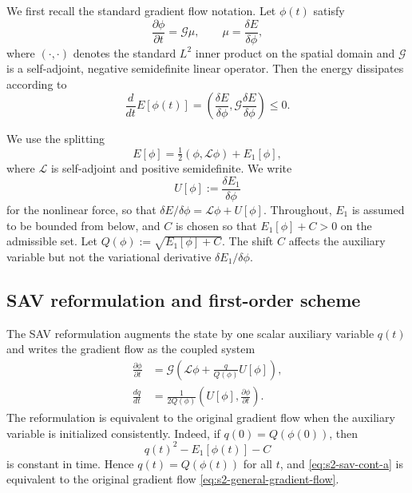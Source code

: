 \documentclass[10pt,onefignum,onetabnum,hidelinks]{siamart251216}
\begin{document}
We first recall the standard gradient flow notation. Let $\phi(t)$ satisfy
\begin{equation}
\frac{\partial \phi}{\partial t}
=
\mathcal G \mu,
\qquad
\mu=\frac{\delta E}{\delta\phi},
\label{eq:s2-general-gradient-flow}
\end{equation}
where $(\cdot,\cdot)$ denotes the standard $L^2$ inner product on the spatial domain and $\mathcal G$ is a self-adjoint, negative semidefinite linear operator. Then the energy dissipates according to
\begin{equation}
\frac{d}{dt}E[\phi(t)]
=
\left(
\frac{\delta E}{\delta\phi},
\mathcal G\frac{\delta E}{\delta\phi}
\right)
\le 0.
\label{eq:s2-continuous-energy-law}
\end{equation}

We use the splitting
\begin{equation}
E[\phi]=\tfrac12(\phi,\mathcal L\phi)+E_1[\phi],
\label{eq:s2-energy-splitting}
\end{equation}
where $\mathcal L$ is self-adjoint and positive semidefinite. We write
\begin{equation}
U[\phi]
:=
\frac{\delta E_1}{\delta\phi}
\label{eq:s2-U-definition}
\end{equation}
for the nonlinear force, so that $\delta E/\delta\phi=\mathcal L\phi+U[\phi]$. Throughout, $E_1$ is assumed to be bounded from below, and $C$ is chosen so that $E_1[\phi]+C>0$ on the admissible set. Let
\(
Q(\phi):=\sqrt{E_1[\phi]+C}.
\)
The shift $C$ affects the auxiliary variable but not the variational derivative $\delta E_1/\delta\phi$.

\subsection{SAV reformulation and first-order scheme}
\label{subsec:first-order-sav}

The SAV reformulation augments the state by one scalar auxiliary variable $q(t)$ and writes the gradient flow as the coupled system
\begin{align}
\frac{\partial \phi}{\partial t}
&=
\mathcal G\left(
\mathcal L\phi+\frac{q}{Q(\phi)}U[\phi]
\right),
\label{eq:s2-sav-cont-a}
\\
\frac{dq}{dt}
&=
\frac{1}{2Q(\phi)}
\left(
U[\phi],\frac{\partial \phi}{\partial t}
\right).
\label{eq:s2-sav-cont-b}
\end{align}
The reformulation is equivalent to the original gradient flow when the auxiliary variable is initialized consistently. Indeed, if $q(0)=Q(\phi(0))$, then
\[
q(t)^2-E_1[\phi(t)]-C
\]
is constant in time. Hence $q(t)=Q(\phi(t))$ for all \(t\), and
\eqref{eq:s2-sav-cont-a} is equivalent to the original gradient flow
\eqref{eq:s2-general-gradient-flow}.
\end{document}
